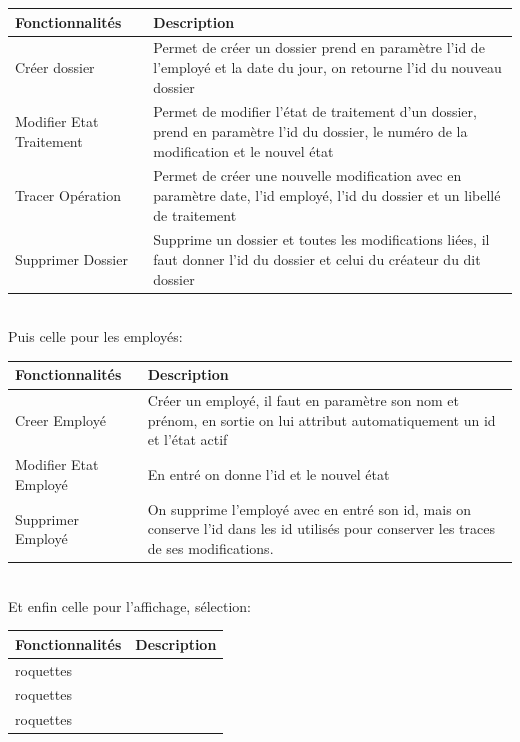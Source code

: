 \documentclass[11pt,a4paper]{article}
\begin{document}
\begin{tabular}{|l|p{30em}|}
  \hline
  Fonctionnalités & Description \\
  \hline
  Créer dossier & Permet de créer un dossier prend en paramètre l'id de l'employé et la date du jour, on retourne l'id du nouveau dossier \\
  \hline
Modifier Etat Traitement &   Permet de modifier l'état de traitement d'un dossier, prend en paramètre l'id du dossier, le numéro de la modification et le nouvel état\\
  \hline
Tracer Opération & Permet de créer une nouvelle modification avec en paramètre date, l'id employé, l'id du dossier et un libellé de traitement \\
  \hline
Supprimer Dossier & Supprime un dossier et toutes les modifications liées, il faut donner l'id du dossier et celui du créateur du dit dossier\\
  \hline

\end{tabular}\\


Puis celle pour les employés:


\begin{tabular}{|l|p{30em}|}
  \hline
  Fonctionnalités & Description \\
  \hline
  Creer Employé & Créer un employé, il faut en paramètre son nom et prénom, en sortie on lui attribut automatiquement un id et l'état actif \\
  \hline
Modifier Etat Employé &   En entré on donne l'id et le nouvel état \\
  \hline
Supprimer Employé & On supprime l'employé avec en entré son id, mais on conserve l'id dans les id utilisés pour conserver les traces de ses modifications. \\
  \hline

\end{tabular}\\

Et enfin celle pour l'affichage, sélection:

\begin{tabular}{|l|p{30em}|}
  \hline
  Fonctionnalités & Description \\
  \hline
  roquettes & \\
  \hline
roquettes &   \\
  \hline
roquettes & \\
  \hline

\end{tabular}\\
\end{document}
